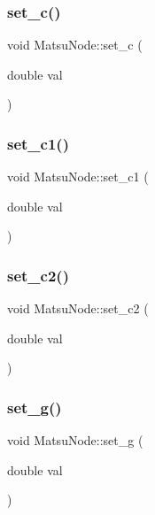 \mbox{\label{classMatsuNode_a9b413bb1cfd2f899be5d6c795c2925d5}} 
\subsubsection{\texorpdfstring{set\+\_\+c()}{set\_c()}}
{\footnotesize\ttfamily void Matsu\+Node\+::set\+\_\+c (\begin{DoxyParamCaption}\item[{double}]{val }\end{DoxyParamCaption})}

\mbox{\label{classMatsuNode_ac73855b7037577ed6c06dce868d8ab5b}} 
\subsubsection{\texorpdfstring{set\+\_\+c1()}{set\_c1()}}
{\footnotesize\ttfamily void Matsu\+Node\+::set\+\_\+c1 (\begin{DoxyParamCaption}\item[{double}]{val }\end{DoxyParamCaption})}

\mbox{\label{classMatsuNode_a6bea0b2a8d747f389ceaeb1374e96398}} 
\subsubsection{\texorpdfstring{set\+\_\+c2()}{set\_c2()}}
{\footnotesize\ttfamily void Matsu\+Node\+::set\+\_\+c2 (\begin{DoxyParamCaption}\item[{double}]{val }\end{DoxyParamCaption})}

\mbox{\label{classMatsuNode_a4ef14db52c49e5ad16c58f35e6356bd6}} 
\subsubsection{\texorpdfstring{set\+\_\+g()}{set\_g()}}
{\footnotesize\ttfamily void Matsu\+Node\+::set\+\_\+g (\begin{DoxyParamCaption}\item[{double}]{val }\end{DoxyParamCaption})}

